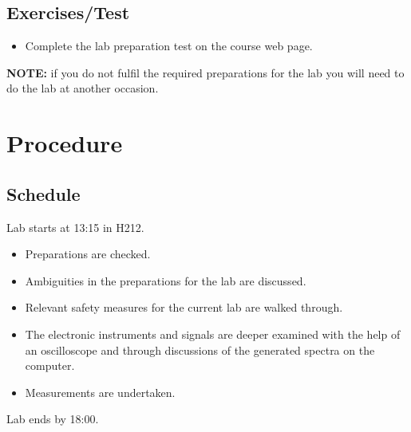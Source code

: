 \documentclass[12pt]{article}
\begin{document}
\subsection{Exercises/Test}
\begin{itemize}
  \item Complete the lab preparation test on the course web page.
\end{itemize}

{\bf NOTE:} if you do not fulfil the required preparations for the lab you will need to do the lab at another occasion.

\section{Procedure}

\subsection{Schedule}
Lab starts at 13:15 in H212.

\begin{itemize}
    \item Preparations are checked. 
    \item Ambiguities in the preparations for the lab are discussed.
    \item Relevant safety measures for the current lab are walked through.
    \item The electronic instruments and signals are deeper examined with the help of an oscilloscope and through discussions of the generated spectra on the computer.
    \item Measurements are undertaken.
\end{itemize}

Lab ends by 18:00.
\end{document}
